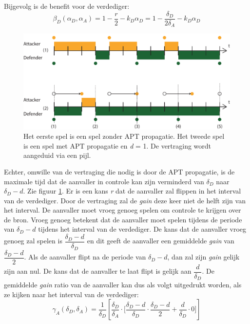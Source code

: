 \documentclass[master=cws, masteroption=vs,english]{kulemt}
\begin{document}
\begin{abstract*}
Bijgevolg is de benefit voor de verdediger:
\begin{equation}\label{first}
\beta_{D}(\alpha_{D},\alpha_{A}) =1 -  \dfrac {r} {2} - k_{D} \alpha_{D} = 1 - \dfrac {\delta_{D}} {2\delta_{A}} - k_{D} \alpha_{D} 
\end{equation}

\begin{figure}[hbtp]
\centering
\includegraphics[scale=0.6]{../../doc/template/Images/Delayuitgelegd}
\caption{Het eerste spel is een spel zonder APT propagatie. Het tweede spel is een spel met APT propagatie en \textit{d} = 1. De vertraging wordt aangeduid via een pijl.}
\label{fig:delaycase1}
\end{figure}


Echter, omwille van de vertraging die nodig is door de APT propagatie, is de maximale tijd dat de aanvaller in controle kan zijn verminderd van $\delta_{D}$ naar $\delta_{D}-d$. Zie figuur \ref{fig:delaycase1}.  Er is een kans \textit{r} dat de aanvaller zal flippen in het interval van de verdediger. Door de vertraging zal de \textit{gain} deze keer niet de helft zijn van het interval. De aanvaller moet vroeg genoeg spelen om controle te krijgen over de bron. Vroeg genoeg betekent dat de aanvaller moet spelen tijdens de periode van $\delta_{D}-d$ tijdens het interval van de verdediger. De kans dat de aanvaller vroeg genoeg zal spelen is $\dfrac{\delta_{D}-d}{\delta_{D}}$ en dit geeft de aanvaller een gemiddelde \textit{gain} van $\dfrac{\delta_{D}-d}{2}$. Als de aanvaller flipt na de periode van $\delta_{D}-d$, dan zal zijn \textit{gain} gelijk zijn aan nul. De kans dat de aanvaller te laat flipt is gelijk aan $\dfrac{d}{\delta_{D}}$. De gemiddelde \textit{gain} ratio van de aanvaller kan dus als volgt uitgedrukt worden, als ze kijken naar het interval van de verdediger:
\begin{equation*}
\gamma_{A}(\delta_{D},\delta_{A}) = \dfrac {1}{\delta_{D}} [ \dfrac{\delta_{D}}{\delta_{A}} \cdot \big[ \dfrac{\delta_{D}-d}{\delta_{D}} \cdot \dfrac{\delta_{D}-d}{2} + \dfrac{d}{\delta_{D}} \cdot 0 \big] ]
\end{equation*}


\end{abstract*}
\end{document}
